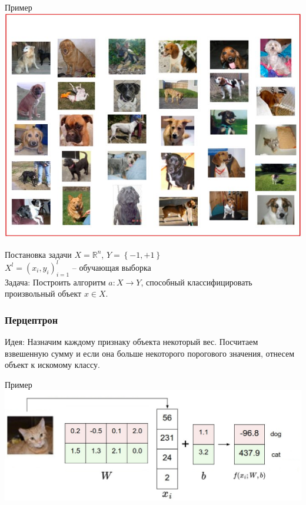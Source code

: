 \documentclass[10pt]{beamer}
\begin{document}
{
\begin{frame}{Пример}
  \centering
  \includegraphics[width=0.9 \textwidth, keepaspectratio]{images/dogs}
\end{frame}
}

\begin{frame}{Постановка задачи}
  $X = \mathbb{R}^n$, ${Y = \left\{ -1, + 1\right\}}$\\
  ${X^l = (x_i, y_i)_{i = 1}^l}$ -- обучающая выборка\\
  \bigbreak
  \alert{Задача}: Построить алгоритм ${a \colon X \rightarrow Y}$, способный классифицировать произвольный объект ${x \in X}$.\\
  
\end{frame}

{
\begin{frame}\frametitle{Перцептрон}
  \alert{Идея}: Назначим каждому признаку объекта некоторый вес. Посчитаем взвешенную сумму и если она больше некоторого порогового значения, отнесем объект к искомому классу. \\
\end{frame}
}

\begin{frame}{Пример}
  \centering
  \includegraphics[width=\textwidth, keepaspectratio]{images/catimagemap}
\end{frame}
\end{document}
